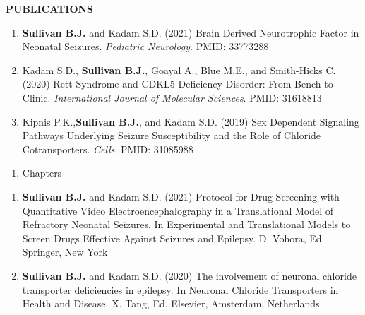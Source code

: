\documentclass{resume} %
\begin{document}
\begin{rSection}{{\bfseries PUBLICATIONS}}
    \begin{enumerate}[resume, leftmargin=2em]
        \item {\bfseries Sullivan B.J.} and Kadam S.D. (2021) Brain Derived Neurotrophic Factor in Neonatal Seizures. \emph{Pediatric Neurology}. PMID: 33773288 
        \item Kadam S.D., {\bfseries Sullivan B.J.}, Goayal A., Blue M.E., and Smith-Hicks C. (2020) Rett Syndrome and CDKL5 Deficiency Disorder: From Bench to Clinic. \emph{International Journal of Molecular Sciences}. PMID: 31618813 
        \item Kipnis P.K.,{\bfseries Sullivan B.J.}, and Kadam S.D. (2019) Sex Dependent Signaling Pathways Underlying Seizure Susceptibility and the Role of Chloride Cotransporters. \emph{Cells}. PMID: 31085988
    \end{enumerate}

    \begin{enumerate}[leftmargin=0pt]
        \item [] Chapters
    \end{enumerate}

    \begin{enumerate}[resume, leftmargin=2em]
        \item {\bfseries Sullivan B.J.} and Kadam S.D. (2021) Protocol for Drug Screening with Quantitative Video Electroencephalography in a Translational Model of Refractory Neonatal Seizures. In Experimental and Translational Models to Screen Drugs Effective Against Seizures and Epilepsy. D. Vohora, Ed. Springer, New York
        \item {\bfseries Sullivan B.J.} and Kadam S.D. (2020) The involvement of neuronal chloride transporter deficiencies in epilepsy. In Neuronal Chloride Transporters in Health and Disease. X. Tang, Ed. Elsevier, Amsterdam, Netherlands.
    \end{enumerate}     
\end{rSection}
\end{document}

